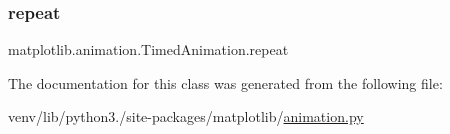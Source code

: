 \mbox{\label{classmatplotlib_1_1animation_1_1TimedAnimation_a20b38c630b623b4957f7c7b16426908a}} 
\subsubsection{\texorpdfstring{repeat}{repeat}}
{\footnotesize\ttfamily matplotlib.\+animation.\+Timed\+Animation.\+repeat}



The documentation for this class was generated from the following file\+:\begin{DoxyCompactItemize}
\item 
venv/lib/python3./site-\/packages/matplotlib/\hyperlink{animation_8py}{animation.\+py}\end{DoxyCompactItemize}
